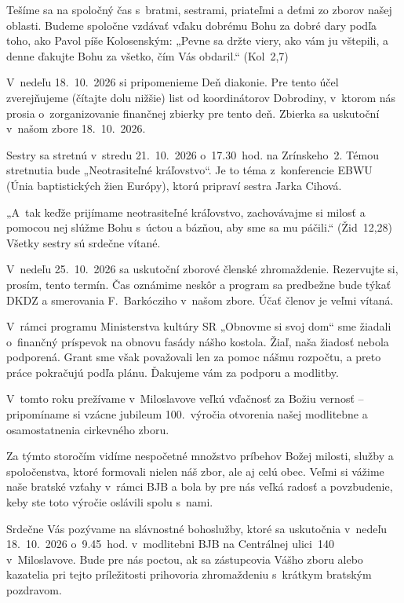 Tešíme sa na spoločný čas s~bratmi, sestrami, priateľmi a deťmi zo zborov našej oblasti.
Budeme spoločne vzdávať vďaku dobrému Bohu za dobré dary podľa toho, ako Pavol píše Kolosenským: „Pevne sa držte viery, ako vám ju vštepili, a denne ďakujte Bohu za všetko, čím Vás obdaril.“ (Kol~2,7)


V~nedeľu 18.~10.~2026 si pripomenieme Deň diakonie. Pre tento účel zverejňujeme
(čítajte dolu nižšie) list od koordinátorov Dobrodiny, v~ktorom nás prosia
o~zorganizovanie finančnej zbierky pre tento deň.
Zbierka sa uskutoční v~našom zbore 18.~10.~2026.


Sestry sa stretnú v~stredu 21.~10.~2026 o~17.30~hod. na Zrínskeho~2.
Témou stretnutia bude „Neotrasiteľné kráľovstvo“.
Je to téma z~konferencie EBWU (Únia baptistických žien Európy), ktorú pripraví sestra Jarka Cihová.

„A~tak keďže prijímame neotrasiteľné kráľovstvo, zachovávajme si milosť a pomocou nej slúžme Bohu s~úctou a bázňou, aby sme sa mu páčili.“ (Žid~12,28)
Všetky sestry sú srdečne vítané.


V~nedeľu 25.~10.~2026 sa uskutoční zborové členské zhromaždenie. Rezervujte si, prosím, tento termín. Čas oznámime neskôr a program sa predbežne bude týkať DKDZ a smerovania F.~Barkócziho v~našom zbore. Účať členov je veľmi vítaná.


V~rámci programu Ministerstva kultúry SR „Obnovme si svoj dom“ sme žiadali
o~finančný príspevok na obnovu fasády nášho kostola. Žiaľ, naša žiadosť nebola podporená. Grant sme však považovali len za pomoc nášmu rozpočtu, a preto práce pokračujú podľa plánu. Ďakujeme vám za podporu a modlitby.




V~tomto roku prežívame v~Miloslavove veľkú vďačnosť za Božiu vernosť -- pripomíname si vzácne jubileum 100.~výročia otvorenia našej modlitebne a osamostatnenia cirkevného zboru.

Za týmto storočím vidíme nespočetné množstvo príbehov Božej milosti, služby a spoločenstva, ktoré formovali nielen náš zbor, ale aj celú obec. Veľmi si vážime naše bratské vzťahy v~rámci BJB a bola by pre nás veľká radosť a povzbudenie, keby ste toto výročie oslávili spolu s~nami.

Srdečne Vás pozývame na slávnostné bohoslužby, ktoré sa uskutočnia v~nedeľu 18.~10.~2026 o~9.45~hod. v~modlitebni BJB na Centrálnej ulici~140 v~Miloslavove. Bude pre nás poctou, ak sa zástupcovia Vášho zboru alebo kazatelia pri tejto príležitosti prihovoria zhromaždeniu s~krátkym bratským pozdravom.

